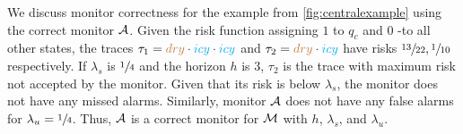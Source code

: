\documentclass[runningheads]{llncs}
\newcommand{\icy}{{\color{cyan} icy}\xspace}
\newcommand{\dry}{{\color{brown} dry}\xspace}
\renewcommand{\paragraph}[1]{\smallskip\noindent\emph{#1}}
\begin{document}
%
%
%
%
%

\begin{example}
    We discuss monitor correctness for the example from \cref{fig:centralexample} using the correct monitor $\mathcal{A}$.
    Given the risk function assigning $1$ to $q_c$ and $0$ -to all other states, the traces $\tau_1 = \dry \cdot \icy \cdot \icy$ and $\tau_2 = \dry \cdot \icy$ have risks $\sfrac{13}{22}, \sfrac{1}{10}$ respectively. If $\lambda_s$ is $\sfrac{1}{4}$ and the horizon $h$ is 3, $\tau_2$ is the trace with maximum risk not accepted by the monitor. Given that its risk is below $\lambda_s$, the monitor does not have any missed alarms. Similarly, monitor $\mathcal{A}$ does not have any false alarms for $\lambda_u = \sfrac{1}{4}$. Thus, $\mathcal{A}$ is a correct monitor for $\mathcal{M}$ with $h$, $\lambda_s$, and $\lambda_u$.
\end{example}
\end{document}
